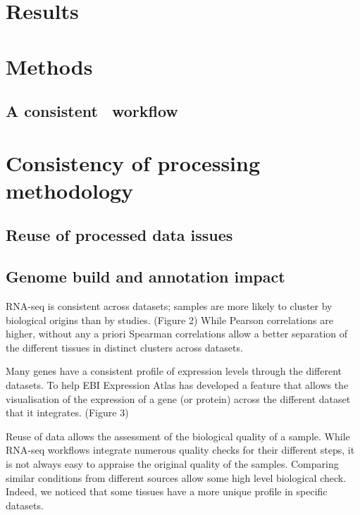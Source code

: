 \section{Results}\label{sec:Trans_Results}
\section{Methods}
\subsection{A consistent \Rnaseq\ workflow}




\section{Consistency of processing methodology}\label{sec:Trans_consistentMethodo}

    \subsection{Reuse of processed data issues}\label{subsec:Trans_reuseOfData}

    \subsection{Genome build and annotation impact}\label{subsec:Trans_AnnotImpact}

RNA-seq is consistent across datasets; samples are more likely to cluster by
biological origins than by studies. (Figure 2)
While Pearson correlations are higher, without any a priori Spearman correlations
allow a better separation of the different tissues in distinct clusters across
datasets.

Many genes have a consistent profile of expression levels through the different
datasets.
To help EBI Expression Atlas has developed a feature that allows the visualisation
of the expression of a gene (or protein) across the different dataset that it
integrates. (Figure 3)

Reuse of data allows the assessment of the biological quality of a sample.
While RNA-seq workflows integrate numerous quality checks for their different steps,
it is not always easy to appraise the original quality of the samples. Comparing
similar conditions from different sources allow some high level biological check.
Indeed, we noticed that some tissues have a more unique profile in specific
datasets.


